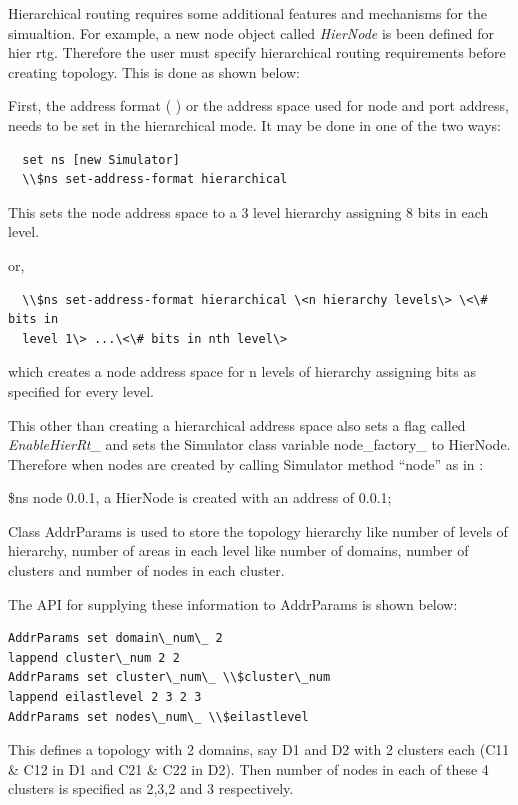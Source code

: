 Hierarchical routing requires some additional features and mechanisms
for the simualtion. For example, a new node object called {\em HierNode}
is been defined for hier rtg. Therefore the user must specify
hierarchical routing requirements before creating topology. This is done
as shown below: 

First, the address format (\label{chap:address} ) or the address space
used for node and port address, needs to be set in the hierarchical
mode. It may be done in one of the two ways:

\begin{verbatim}
  set ns [new Simulator]
  \\$ns set-address-format hierarchical
\end{verbatim} 

This sets the node address space to a 3 level hierarchy assigning 8 bits
in each level.

or,
\begin{verbatim}
  \\$ns set-address-format hierarchical \<n hierarchy levels\> \<\# bits in
  level 1\> ...\<\# bits in nth level\>
\end{verbatim} 

which creates a node address space for n levels of hierarchy assigning
bits as specified for every level.

This other than creating a hierarchical address space also sets a flag
called {\em EnableHierRt\_} and sets the Simulator class variable
node\_factory\_ to HierNode.  
Therefore when nodes are created by calling Simulator method ``node'' as
in :

\$ns node 0.0.1,
a HierNode is created with an address of 0.0.1;

Class AddrParams is used to store the topology hierarchy like number
of levels of hierarchy, number of areas in each level like number of
domains, number of clusters and number of nodes in each cluster.

The API for supplying these information to AddrParams is shown below:

\begin{verbatim}
AddrParams set domain\_num\_ 2
lappend cluster\_num 2 2
AddrParams set cluster\_num\_ \\$cluster\_num
lappend eilastlevel 2 3 2 3
AddrParams set nodes\_num\_ \\$eilastlevel
\end{verbatim}

This defines a topology with 2 domains, say D1 and D2 with 2 clusters
each (C11 \& C12 in D1 and C21 \& C22 in D2). Then number of nodes in
each of these 4 clusters is specified as 2,3,2 and 3 respectively.

